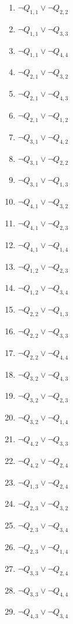 \documentclass[22pt]{article}
\begin{document}
\begin{multicols}{4}
\begin{enumerate}
	\item $\neg Q_{1,1} \lor \neg Q_{2,2}$
	\item $\neg Q_{1,1} \lor \neg Q_{3,3}$
	\item $\neg Q_{1,1} \lor \neg Q_{4,4}$
	\item $\neg Q_{2,1} \lor \neg Q_{3,2}$
	\item $\neg Q_{2,1} \lor \neg Q_{4,3}$
	\item $\neg Q_{2,1} \lor \neg Q_{1,2}$
	\item $\neg Q_{3,1} \lor \neg Q_{4,2}$
	\item $\neg Q_{3,1} \lor \neg Q_{2,2}$
	\item $\neg Q_{3,1} \lor \neg Q_{1,3}$
	\item $\neg Q_{4,1} \lor \neg Q_{3,2}$
	\item $\neg Q_{4,1} \lor \neg Q_{2,3}$
	\item $\neg Q_{4,1} \lor \neg Q_{1,4}$

	\item $\neg Q_{1,2} \lor \neg Q_{2,3}$
	\item $\neg Q_{1,2} \lor \neg Q_{3,4}$
	\item $\neg Q_{2,2} \lor \neg Q_{1,3}$
	\item $\neg Q_{2,2} \lor \neg Q_{3,3}$
	\item $\neg Q_{2,2} \lor \neg Q_{4,4}$
	\item $\neg Q_{3,2} \lor \neg Q_{4,3}$
	\item $\neg Q_{3,2} \lor \neg Q_{2,3}$
	\item $\neg Q_{3,2} \lor \neg Q_{1,4}$
	\item $\neg Q_{4,2} \lor \neg Q_{3,3}$
	\item $\neg Q_{4,2} \lor \neg Q_{2,4}$

	\item $\neg Q_{1,3} \lor \neg Q_{2,4}$
	\item $\neg Q_{2,3} \lor \neg Q_{3,2}$
	\item $\neg Q_{2,3} \lor \neg Q_{3,4}$
	\item $\neg Q_{2,3} \lor \neg Q_{1,4}$
	\item $\neg Q_{3,3} \lor \neg Q_{2,4}$
	\item $\neg Q_{3,3} \lor \neg Q_{4,4}$
	\item $\neg Q_{4,3} \lor \neg Q_{3,4}$

\end{enumerate}
\end{multicols}
\end{document}
